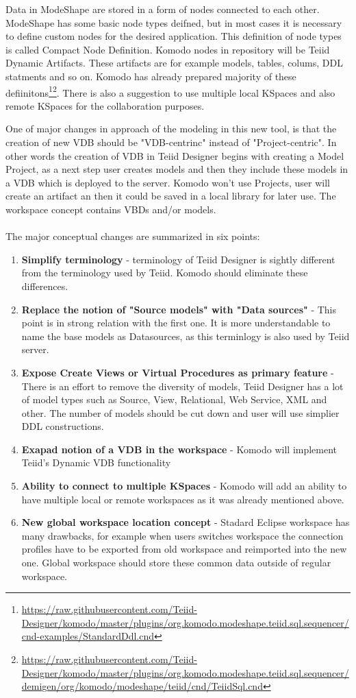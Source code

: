 \documentclass[12pt,oneside]{fithesis2}
\begin{document}
\par Data in ModeShape are stored in a form of nodes connected to each other.  ModeShape has some basic node types deifned, but in most cases it is necessary to define custom nodes for the desired application. This definition of node types is called Compact Node Definition. Komodo nodes in repository will be Teiid Dynamic Artifacts. These artifacts are for example models, tables, colums, DDL statments and so on. Komodo has already prepared majority of these defiinitons\footnote{\url{https://raw.githubusercontent.com/Teiid-Designer/komodo/master/plugins/org.komodo.modeshape.teiid.sql.sequencer/cnd-examples/StandardDdl.cnd}}\footnote{\url{https://raw.githubusercontent.com/Teiid-Designer/komodo/master/plugins/org.komodo.modeshape.teiid.sql.sequencer/demigen/org/komodo/modeshape/teiid/cnd/TeiidSql.cnd}}. There is also a suggestion to use multiple local KSpaces and also remote KSpaces for the collaboration purposes. 
\par One of major changes in approach of the modeling in this new tool, is that the creation of new VDB should be "VDB-centrinc" instead of "Project-centric". In other words the creation of VDB in Teiid Designer begins with creating a Model Project, as a next step user creates models and then they include these models in a VDB which is deployed to the server. Komodo won't use Projects, user will create an artifact an then it could be saved in a local library for later use. The workspace concept contains VBDs and/or models.\\ \\
The major conceptual changes are summarized in six points\cite{Komodo}:
\begin{enumerate}
\item \textbf{Simplify terminology }- terminology of Teiid Designer is sightly different from the terminology used by Teiid. Komodo should eliminate these differences.
\item \textbf{Replace the notion of "Source models" with "Data sources" }- This point is in strong relation with the first one. It is more understandable to name the base models as Datasources, as this terminlogy is also used by Teiid server.
\item \textbf{Expose Create Views or Virtual Procedures as primary feature} - There is an effort to remove the diversity of models, Teiid Designer has a lot of model types such as Source, View, Relational, Web Service, XML and other. The number of models should be cut down and user will use simplier DDL constructions.
\item \textbf{Exapad notion of a VDB in the workspace} - Komodo will implement Teiid's Dynamic VDB functionality
\item \textbf{Ability to connect to multiple KSpaces} - Komodo will add an ability to have multiple local or remote workspaces as it was already mentioned above.
\item \textbf{New global workspace location concept} - Stadard Eclipse workspace has many drawbacks, for example when users switches workspace the connection profiles have to be exported from old workspace and reimported into the new one. Global workspace should store these common data outside of regular workspace.
\end{enumerate}
\end{document}
